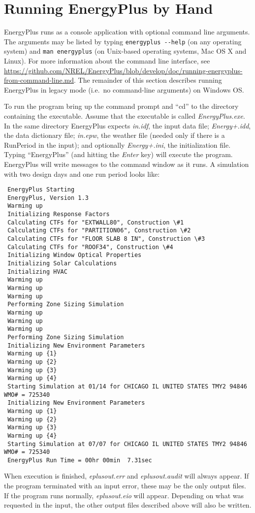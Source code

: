 \section{Running EnergyPlus by Hand}\label{running-energyplus-by-hand}

EnergyPlus runs as a console application with optional command line arguments. The arguments may be listed by typing \lstinline!energyplus --help! (on any operating system) and \lstinline!man energyplus! (on Unix-based operating systems, Mac OS X and Linux). For more information about the command line interface, see \url{https://github.com/NREL/EnergyPlus/blob/develop/doc/running-energyplus-from-command-line.md}. The remainder of this section describes running EnergyPlus in legacy mode (i.e.~no command-line arguments) on Windows OS.

To run the program bring up the command prompt and ``cd'' to the directory containing the executable. Assume that the executable is called \emph{EnergyPlus.exe}. In the same directory EnergyPlus expects \emph{in.idf}, the input data file; \emph{Energy+.idd}, the data dictionary file; \emph{in.epw}, the weather file (needed only if there is a RunPeriod in the input); and optionally \emph{Energy+.ini}, the initialization file. Typing ``EnergyPlus'' (and hitting the \emph{Enter} key) will execute the program. EnergyPlus will write messages to the command window as it runs. A simulation with two design days and one run period looks like:

\begin{lstlisting}
 EnergyPlus Starting
 EnergyPlus, Version 1.3
 Warming up
 Initializing Response Factors
 Calculating CTFs for "EXTWALL80", Construction \#1
 Calculating CTFs for "PARTITION06", Construction \#2
 Calculating CTFs for "FLOOR SLAB 8 IN", Construction \#3
 Calculating CTFs for "ROOF34", Construction \#4
 Initializing Window Optical Properties
 Initializing Solar Calculations
 Initializing HVAC
 Warming up
 Warming up
 Warming up
 Performing Zone Sizing Simulation
 Warming up
 Warming up
 Warming up
 Performing Zone Sizing Simulation
 Initializing New Environment Parameters
 Warming up {1}
 Warming up {2}
 Warming up {3}
 Warming up {4}
 Starting Simulation at 01/14 for CHICAGO IL UNITED STATES TMY2 94846 WMO# = 725340
 Initializing New Environment Parameters
 Warming up {1}
 Warming up {2}
 Warming up {3}
 Warming up {4}
 Starting Simulation at 07/07 for CHICAGO IL UNITED STATES TMY2 94846 WMO# = 725340
 EnergyPlus Run Time = 00hr 00min  7.31sec
\end{lstlisting}

When execution is finished, \emph{eplusout.err} and \emph{eplusout.audit} will always appear. If the program terminated with an input error, these may be the only output files. If the program runs normally, \emph{eplusout.eio} will appear. Depending on what was requested in the input, the other output files described above will also be written.
